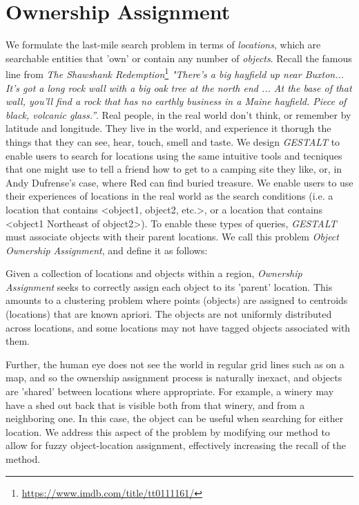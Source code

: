 \section{Ownership Assignment}
\label{section:ownership}


We formulate the last-mile search problem in terms of \textit{locations}, which are searchable entities that 'own' or contain any number of \textit{objects}. 
Recall the famous line from \textit{The Shawshank Redemption}\footnote{\href{https://www.imdb.com/title/tt0111161/}{https://www.imdb.com/title/tt0111161/}} \textit{"There’s a big hayfield up near Buxton... It’s got a long rock wall with a big oak tree at the north end ... At the base of that wall, you’ll find a rock that has no earthly business in a Maine hayfield. Piece of black, volcanic glass.”}. 
Real people, in the real world don't think, or remember by latitude and longitude. 
They live in the world, and experience it thorugh the things that they can see, hear, touch, smell and taste. 
We design \emph{GESTALT} to enable users to search for locations using the same intuitive tools and tecniques that one might use to tell a friend how to get to a camping site they like, or, in Andy Dufrense's case, where Red can find buried treasure. 
We enable users to use their experiences of locations in the real world as the search conditions (i.e. a location that contains <object1, object2, etc.>, or a location that contains <object1 Northeast of object2>). 
To enable these types of queries, \emph{GESTALT} must associate objects with their parent locations.
We call this problem \textit{Object Ownership Assignment}, and define it as follows:

Given a collection of locations and objects within a region, \emph{Ownership Assignment} seeks to correctly assign each object to its 'parent' location. 
This amounts to a clustering problem where points (objects) are assigned to centroids (locations) that are known apriori. 
The objects are not uniformly distributed across locations, and some locations may not have tagged objects associated with them. 


Further, the human eye does not see the world in regular grid lines such as on a map, and so the ownership assignment process is naturally inexact, and objects are 'shared' between locations where appropriate.
For example, a winery may have a shed out back that is visible both from that winery, and from a neighboring one. 
In this case, the object can be useful when searching for either location. 
We address this aspect of the problem by modifying our method to allow for fuzzy object-location assignment, effectively increasing the recall of the method. 



